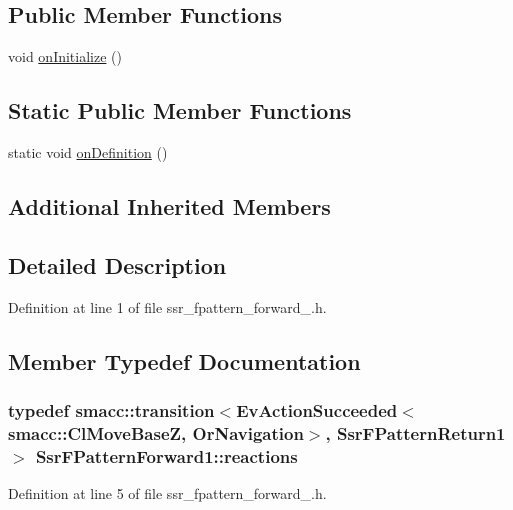 \subsection*{Public Member Functions}
\begin{DoxyCompactItemize}
\item 
void \hyperlink{structSsrFPatternForward1_a532baa064c9773096c8fd6ce430ac4b3}{on\+Initialize} ()
\end{DoxyCompactItemize}
\subsection*{Static Public Member Functions}
\begin{DoxyCompactItemize}
\item 
static void \hyperlink{structSsrFPatternForward1_ab8a08022167461f22892be52f10bba9c}{on\+Definition} ()
\end{DoxyCompactItemize}
\subsection*{Additional Inherited Members}


\subsection{Detailed Description}


Definition at line 1 of file ssr\+\_\+fpattern\+\_\+forward\+\_.\+h.



\subsection{Member Typedef Documentation}
\subsubsection[{\texorpdfstring{reactions}{reactions}}]{\setlength{\rightskip}{0pt plus 5cm}typedef {\bf smacc\+::transition}$<$Ev\+Action\+Succeeded$<${\bf smacc\+::\+Cl\+Move\+BaseZ}, Or\+Navigation$>$, {\bf Ssr\+F\+Pattern\+Return1}$>$ {\bf Ssr\+F\+Pattern\+Forward1\+::reactions}}\hypertarget{structSsrFPatternForward1_a69ca2877827b56eebce83cce2140a4ea}{}\label{structSsrFPatternForward1_a69ca2877827b56eebce83cce2140a4ea}


Definition at line 5 of file ssr\+\_\+fpattern\+\_\+forward\+\_.\+h.



